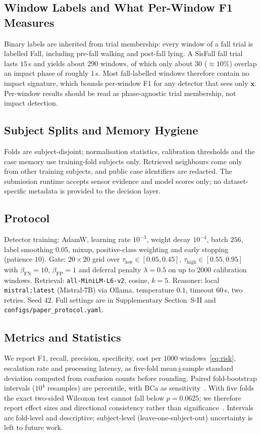 \documentclass[journal]{IEEEtran}
\begin{document}
\subsection{Window Labels and What Per-Window F1 Measures}
\label{sec:labels}
Binary labels are inherited from trial membership: every window of a fall trial is labelled Fall, including pre-fall walking and post-fall lying. A SisFall fall trial lasts $15$\,s and yields about $290$ windows, of which only about $30$ ($\approx 10\%$) overlap an impact phase of roughly $1$\,s. Most fall-labelled windows therefore contain no impact signature, which bounds per-window F1 for any detector that sees only $\mathbf{x}$. Per-window results should be read as phase-agnostic trial membership, not impact detection.

\subsection{Subject Splits and Memory Hygiene}
\label{sec:hygiene}
Folds are subject-disjoint; normalisation statistics, calibration thresholds and
the case memory use training-fold subjects only. Retrieved neighbours come only
from other training subjects, and public case identifiers are redacted. The
submission runtime accepts sensor evidence and model scores only; no
dataset-specific metadata is provided to the decision layer.

\subsection{Protocol}
Detector training: AdamW, learning rate $10^{-3}$, weight decay $10^{-4}$, batch $256$, label smoothing $0.05$, mixup, positive-class weighting and early stopping (patience $10$). Gate: $20{\times}20$ grid over $\tau_{\mathrm{low}}\in[0.05,0.45]$, $\tau_{\mathrm{high}}\in[0.55,0.95]$ with $\beta_{\mathrm{FN}}{=}10$, $\beta_{\mathrm{FP}}{=}1$ and deferral penalty $\lambda{=}0.5$ on up to $2000$ calibration windows. Retrieval: \texttt{all-MiniLM-L6-v2}, cosine, $k{=}5$. Reasoner: local \texttt{mistral:latest} (Mistral-7B) via Ollama, temperature $0.1$, timeout $60$\,s, two retries. Seed $42$. Full settings are in Supplementary Section~S-II and \texttt{configs/paper\_protocol.yaml}.

\subsection{Metrics and Statistics}
We report F1, recall, precision, specificity, cost per $1000$ windows~\eqref{eq:risk}, escalation rate and processing latency, as five-fold mean$\pm$sample standard deviation computed from confusion counts before rounding. Paired fold-bootstrap intervals ($10^4$ resamples) are percentile, with BCa as sensitivity~\cite{efron1987bca}. With five folds the exact two-sided Wilcoxon test cannot fall below $p{=}0.0625$; we therefore report effect sizes and directional consistency rather than significance~\cite{demsar2006statistical}. Intervals are fold-level and descriptive; subject-level (leave-one-subject-out) uncertainty is left to future work.
\end{document}
